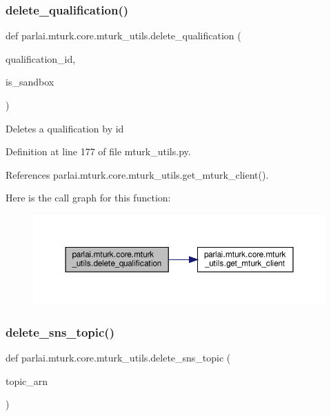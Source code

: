 \subsubsection{\texorpdfstring{delete\+\_\+qualification()}{delete\_qualification()}}
{\footnotesize\ttfamily def parlai.\+mturk.\+core.\+mturk\+\_\+utils.\+delete\+\_\+qualification (\begin{DoxyParamCaption}\item[{}]{qualification\+\_\+id,  }\item[{}]{is\+\_\+sandbox }\end{DoxyParamCaption})}

\begin{DoxyVerb}Deletes a qualification by id\end{DoxyVerb}
 

Definition at line 177 of file mturk\+\_\+utils.\+py.



References parlai.\+mturk.\+core.\+mturk\+\_\+utils.\+get\+\_\+mturk\+\_\+client().

Here is the call graph for this function\+:
\nopagebreak
\begin{figure}[H]
\begin{center}
\leavevmode
\includegraphics[width=350pt]{namespaceparlai_1_1mturk_1_1core_1_1mturk__utils_a389ca1d743e6319cb35916a6b0d7867d_cgraph}
\end{center}
\end{figure}
\mbox{\label{namespaceparlai_1_1mturk_1_1core_1_1mturk__utils_a669fa20824749469221df338aa8a0e8e}} 
\subsubsection{\texorpdfstring{delete\+\_\+sns\+\_\+topic()}{delete\_sns\_topic()}}
{\footnotesize\ttfamily def parlai.\+mturk.\+core.\+mturk\+\_\+utils.\+delete\+\_\+sns\+\_\+topic (\begin{DoxyParamCaption}\item[{}]{topic\+\_\+arn }\end{DoxyParamCaption})}



